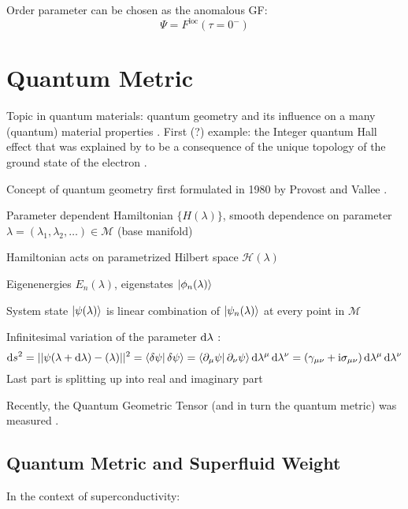 \documentclass[../notes.tex]{subfiles}
\begin{document}
Order parameter can be chosen as the anomalous GF:
\begin{equation}
	\Psi = F^{\mathrm{loc}} (\tau = 0^-)
\end{equation}



\section{Quantum Metric}\label{sec:quantum-metric}

Topic in quantum materials: quantum geometry and its influence on a many (quantum) material properties \cite{yuQuantumGeometryQuantum2024}.
First (?) example: the Integer quantum Hall effect \cite{klitzingNewMethodHighAccuracy1980} that was explained by \citeauthor{thoulessQuantizedHallConductance1982} to be a consequence of the unique topology of the ground state of the electron \cite{thoulessQuantizedHallConductance1982}.

Concept of quantum geometry first formulated in 1980 by Provost and Vallee \cite{provostRiemannianStructureManifolds1980}.

Parameter dependent Hamiltonian \(\{H(\lambda)\}\), smooth dependence on parameter \(\lambda = (\lambda_1, \lambda_2, \ldots) \in \mathcal{M}\) (base manifold)

Hamiltonian acts on parametrized Hilbert space \(\mathcal{H} (\lambda)\)

Eigenenergies \(E_n (\lambda)\), eigenstates \(\ket{\phi_n (\lambda)}\)

System state \(\ket{\psi (\lambda)}\) is linear combination of \(\ket{\psi_n (\lambda)}\) at every point in \(\mathcal{M}\)

Infinitesimal variation of the parameter \(\odif{\lambda}\) :
\begin{equation}
	\odif{s^2} = \vert\vert \psi (\lambda + \odif{\lambda}) - \si (\lambda) \vert \vert^2 = \braket{\fdif{\psi} | \fdif{\psi}} = \braket{\pdif{\mu} \psi | \pdif{\nu} \psi} \odif{\lambda^{\mu}} \odif{\lambda^{\nu}} = (\gamma_{\mu \nu} + \iu \sigma_{\mu \nu}) \odif{\lambda^{\mu}} \odif{\lambda^{\nu}}
\end{equation}
Last part is splitting up into real and imaginary part

Recently, the Quantum Geometric Tensor (and in turn the quantum metric) was measured \cite{kangMeasurementsQuantumGeometric2025}.

\subsection*{Quantum Metric and Superfluid Weight}

In the context of superconductivity: 

\cite{peottaSuperfluidityTopologicallyNontrivial2015, liangBandGeometryBerry2017, tormaSuperconductivitySuperfluidityQuantum2022}

\end{document}

